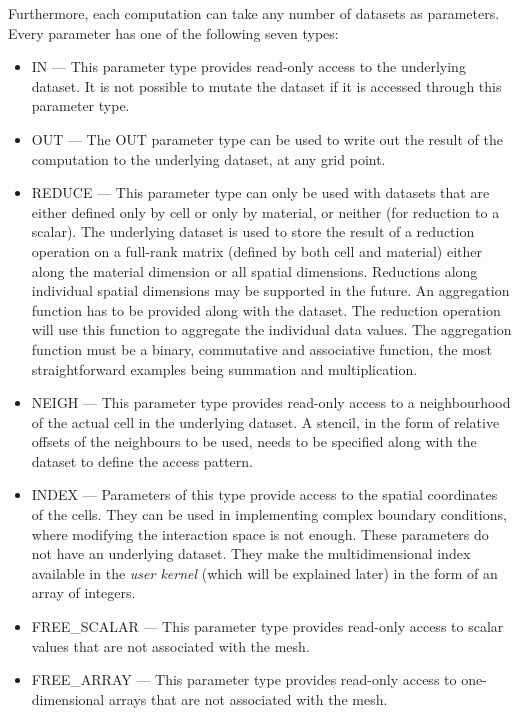 \documentclass[fontsize=11pt, appendixprefix=true]{scrreprt}
\begin{document}
Furthermore, each computation can take any number of datasets as parameters.
Every parameter has one of the following seven types:

\begin{itemize}
  \item IN --- This parameter type provides read-only access to the underlying
    dataset. It is not possible to mutate the dataset if it is accessed through
    this parameter type.
  \item OUT --- The OUT parameter type can be used to write out the result of
    the computation to the underlying dataset, at any grid point.
  \item REDUCE --- This parameter type can only be used with datasets that are
    either defined only by cell or only by material, or neither (for reduction
    to a scalar).  The underlying dataset is used to store the result of a
    reduction operation on a full-rank matrix (defined by both cell and
    material) either along the material dimension or all spatial
    dimensions. Reductions along individual spatial dimensions may be supported
    in the future. An aggregation function has to be provided along with the
    dataset. The reduction operation will use this function to aggregate the
    individual data values. The aggregation function must be a binary,
    commutative and associative function, the most straightforward examples
    being summation and multiplication.
  \item NEIGH --- This parameter type provides read-only access to a
    neighbourhood of the actual cell in the underlying dataset. A stencil, in
    the form of relative offsets of the neighbours to be used, needs to be
    specified along with the dataset to define the access pattern.
  \item INDEX --- Parameters of this type provide access to the spatial
    coordinates of the cells.  They can be used in implementing complex boundary
    conditions, where modifying the interaction space is not enough.  These
    parameters do not have an underlying dataset. They make the multidimensional
    index available in the \textit{user kernel} (which will be explained later)
    in the form of an array of integers.
  \item FREE\_SCALAR --- This parameter type provides read-only access to scalar
    values that are not associated with the mesh.
  \item FREE\_ARRAY --- This parameter type provides read-only access to
    one-dimensional arrays that are not associated with the mesh.
\end{itemize}
\end{document}
